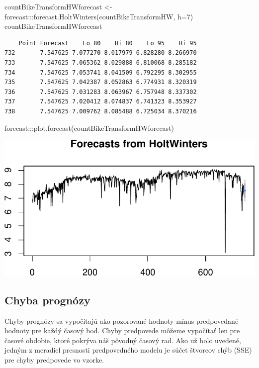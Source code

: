 \documentclass[
  letterpaper,
  DIV=11,
  numbers=noendperiod]{scrreprt}
\newenvironment{Shaded}{\begin{snugshade}}{\end{snugshade}}
\newcommand{\AttributeTok}[1]{\textcolor[rgb]{0.40,0.45,0.13}{#1}}
\newcommand{\DecValTok}[1]{\textcolor[rgb]{0.68,0.00,0.00}{#1}}
\newcommand{\FunctionTok}[1]{\textcolor[rgb]{0.28,0.35,0.67}{#1}}
\newcommand{\NormalTok}[1]{\textcolor[rgb]{0.00,0.23,0.31}{#1}}
\newcommand{\OtherTok}[1]{\textcolor[rgb]{0.00,0.23,0.31}{#1}}
\newcommand{\SpecialCharTok}[1]{\textcolor[rgb]{0.37,0.37,0.37}{#1}}
\begin{document}
\begin{Shaded}
\begin{Highlighting}[]
\NormalTok{countBikeTransformHWforecast }\OtherTok{\textless{}{-}}\NormalTok{ forecast}\SpecialCharTok{:::}\FunctionTok{forecast.HoltWinters}\NormalTok{(countBikeTransformHW, }\AttributeTok{h=}\DecValTok{7}\NormalTok{)}
\NormalTok{countBikeTransformHWforecast}
\end{Highlighting}
\end{Shaded}

\begin{verbatim}
    Point Forecast    Lo 80    Hi 80    Lo 95    Hi 95
732       7.547625 7.077270 8.017979 6.828280 8.266970
733       7.547625 7.065362 8.029888 6.810068 8.285182
734       7.547625 7.053741 8.041509 6.792295 8.302955
735       7.547625 7.042387 8.052863 6.774931 8.320319
736       7.547625 7.031283 8.063967 6.757948 8.337302
737       7.547625 7.020412 8.074837 6.741323 8.353927
738       7.547625 7.009762 8.085488 6.725034 8.370216
\end{verbatim}

\begin{Shaded}
\begin{Highlighting}[]
\NormalTok{forecast}\SpecialCharTok{:::}\FunctionTok{plot.forecast}\NormalTok{(countBikeTransformHWforecast)}
\end{Highlighting}
\end{Shaded}

\includegraphics{prednaska2_HoltWinters_files/figure-pdf/unnamed-chunk-11-2.pdf}

\subsection{Chyba prognózy}\label{chyba-prognuxf3zy}

Chyby prognózy sa vypočítajú ako pozorované hodnoty mínus predpovedané
hodnoty pre každý časový bod. Chyby predpovede môžeme vypočítať len pre
časové obdobie, ktoré pokrýva náš pôvodný časový rad. Ako už bolo
uvedené, jedným z meradiel presnosti predpovedného modelu je súčet
štvorcov chýb (SSE) pre chyby predpovede vo vzorke.
\end{document}
